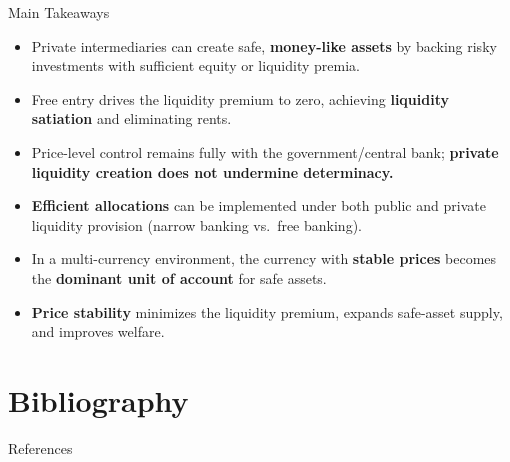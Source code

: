 \documentclass[11pt,aspectratio=169]{beamer}
\begin{document}
\begin{frame}{Main Takeaways}
\small
\begin{itemize}

    \item Private intermediaries can create safe, \textbf{money-like assets} by backing risky investments with sufficient equity or liquidity premia.

    \vspace{0.6em}

    \item Free entry drives the liquidity premium to zero, achieving \textbf{liquidity satiation} and eliminating rents.

    \vspace{0.6em}

    \item Price-level control remains fully with the government/central bank; \textbf{private liquidity creation does not undermine determinacy.}

    \vspace{0.6em}

    \item \textbf{Efficient allocations }can be implemented under both public and private liquidity provision (narrow banking vs.\ free banking).

    \vspace{0.6em}

    \item In a multi-currency environment, the currency with \textbf{stable prices} becomes the \textbf{dominant unit of account} for safe assets.

    \vspace{0.6em}

    \item \textbf{Price stability }minimizes the liquidity premium, expands safe-asset supply, and improves welfare.

\end{itemize}
\end{frame}

\section{Bibliography}

\begin{frame}{References}
\printbibliography
\end{frame}
\end{document}
